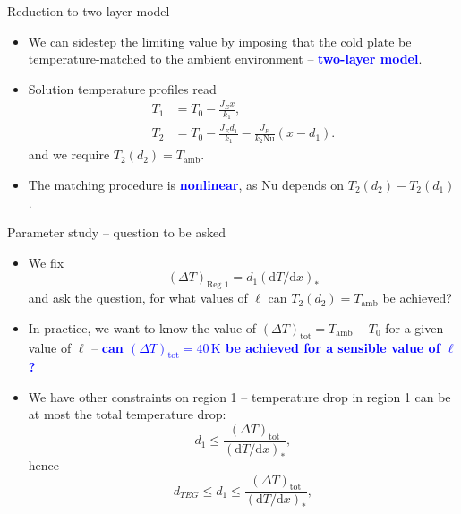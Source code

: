 \documentclass[10pt,mathserif]{beamer}
\newcommand{\mathd}{\mathrm{d}}
\newcommand{\mynu}{\mathrm{Nu}}
\newcommand{\Tamb}{T_{\mathrm{amb}}}
\newcommand{\Je}{J_E}
\newcommand{\emphlon}[1]{\textcolor{blue}{\textbf{#1}}}
\begin{document}
\begin{frame}{Reduction to two-layer model}

\begin{itemize}
\item We can sidestep the limiting value by imposing that the cold plate be temperature-matched to the ambient environment -- \emphlon{two-layer model}.
\item Solution temperature profiles read
%
\begin{align*}
T_1&=T_0-\frac{\Je x}{k_1},\\
T_2&=T_0-\frac{\Je d_1}{k_1}-\frac{\Je}{k_2\mynu}(x-d_1).
\end{align*}
%
and we require $T_2(d_2)=\Tamb$.
%
\item The matching procedure is \emphlon{nonlinear}, as $\mynu$ depends on $T_2(d_2)-T_2(d_1)$.
\end{itemize}
\end{frame}

\begin{frame}{Parameter study -- question to be asked}

\begin{itemize}
\item  We fix
%
\[
\left(\Delta T\right)_{\text{Reg 1}}=d_1\left(\mathd T/\mathd x\right)_*
\]
%
and ask the question, for what values of $\ell$ can $T_2(d_2)=\Tamb$ be achieved?  
\item In practice, we want to know the value of $(\Delta T)_{\mathrm{tot}}=\Tamb-T_0$ for a given value of $\ell$ -- \emphlon{can  $(\Delta T)_{\mathrm{tot}}=40\,\mathrm{K}$ be achieved for a sensible value of $\ell$?}
\item We have other constraints on region 1 -- temperature drop in region 1 can be at most the total temperature drop:
%
\[
d_1\leq \frac{\left(\Delta T\right)_{\mathrm{tot}}}{\left(\mathd T/\mathd x\right)_*},
\]
hence
%
\[
d_{TEG}\leq d_1\leq \frac{\left(\Delta T\right)_{\mathrm{tot}}}{\left(\mathd T/\mathd x\right)_*},
\]
\end{itemize}
%
\end{frame}
\end{document}

